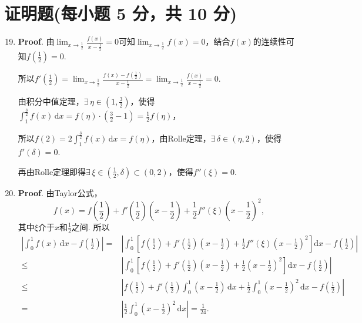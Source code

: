 \documentclass[../main.tex]{subfiles}
\begin{document}
\section{证明题(每小题 5 分，共 10 分)}
\begin{enumerate}
    \setcounter{enumi}{18}
    \item \textbf{Proof}. 由$\lim_{x\to\frac{1}{2}}\frac{f(x)}{x-\frac{1}{2}}
              =0$可知$\lim_{x\to\frac{1}{2}}f(x)=0$，结合$f(x)$的连续性可知$f\left(\frac{1}{2}
              \right)=0$.

          所以$f'\left(\frac{1}{2}\right)=\lim_{x\to\frac{1}{2}}\frac{f(x)-f\left(\frac{1}{2}\right)}{x-\frac{1}{2}}
              =\lim_{x\to\frac{1}{2}}\frac{f(x)}{x-\frac{1}{2}}=0$.

          由积分中值定理，$\exists\,\eta\in\left(1,\frac{3}{2}\right)$，使得$\int_{1}
              ^{\frac{3}{2}}f(x)\,\mathrm{d}x=f(\eta)\cdot\left(\frac{3}{2}-1\right)=\frac{1}{2}
              f(\eta)$，

          所以$f(2)=2\int_{1}^{\frac{3}{2}}f(x)\,\mathrm{d}x=f(\eta)$，由Rolle定理，$\exists
              \,\delta\in\left(\eta,2\right)$，使得$f'(\delta)=0$.

          再由Rolle定理即得$\exists\,\xi\in\left(\frac{1}{2},\delta\right)\subset(0,2
              )$，使得$f''(\xi)=0$.

    \item \textbf{Proof}. 由Taylor公式，
          \[
              f(x)=f\left(\frac{1}{2}\right)+f'\left
              (\frac{1}{2}\right)\left(x-\frac{1}{2}\right)+\frac{1}{2}f''(\xi)\left(x-\frac{1}{2}
              \right)^{2},
          \]
          其中$\xi$介于$x$和$\frac{1}{2}$之间. 所以
          \[
              \begin{aligned}
                  \left|\int_{0}^{1}f(x)\,\mathrm{d}x-f\left(\frac{1}{2}\right)\right| = {} & \left|\int_{0}^{1}\left[f\left(\frac{1}{2}\right)+f'\left(\frac{1}{2}\right)\left(x-\frac{1}{2}\right)+\frac{1}{2}f''(\xi)\left(x-\frac{1}{2}\right)^{2}\right]\mathrm{d}x-f\left(\frac{1}{2}\right)\right|       \\
                  \leq {}                                                                   & \left|\int_{0}^{1}\left[f\left(\frac{1}{2}\right)+f'\left(\frac{1}{2}\right)\left(x-\frac{1}{2}\right)+\frac{1}{2}\left(x-\frac{1}{2}\right)^{2}\right]\mathrm{d}x-f\left(\frac{1}{2}\right)\right|               \\
                  \leq {}                                                                   & \left|f\left(\frac{1}{2}\right)+f'\left(\frac{1}{2}\right)\int_{0}^{1}\left(x-\frac{1}{2}\right)\,\mathrm{d}x+\frac{1}{2}\int_{0}^{1}\left(x-\frac{1}{2}\right)^{2}\,\mathrm{d}x-f\left(\frac{1}{2}\right)\right| \\
                  = {}                                                                      & \left|\frac{1}{2}\int_{0}^{1}\left(x-\frac{1}{2}\right)^{2}\,\mathrm{d}x\right| = \frac{1}{24}.
              \end{aligned}
          \]
\end{enumerate}
\end{document}
